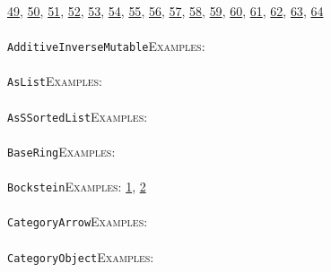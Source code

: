 \documentclass[a4paper,11pt]{report}
\begin{document}
{{\href{../www/SideLinks/About/aboutSpaceGroup.html} {49}{\nobreakspace}, \href{../www/SideLinks/About/aboutFunctorial.html} {50}{\nobreakspace}, \href{../www/SideLinks/About/aboutSuperperfect.html} {51}{\nobreakspace}, \href{../www/SideLinks/About/aboutGouter.html} {52}{\nobreakspace}, \href{../www/SideLinks/About/aboutSurvey.html} {53}{\nobreakspace}, \href{../www/SideLinks/About/aboutGraphsOfGroups.html} {54}{\nobreakspace}, \href{../www/SideLinks/About/aboutTDA.html} {55}{\nobreakspace}, \href{../www/SideLinks/About/aboutIntro.html} {56}{\nobreakspace}, \href{../www/SideLinks/About/aboutKnots.html} {57}{\nobreakspace}, \href{../www/SideLinks/About/aboutTensorSquare.html} {58}{\nobreakspace}, \href{../www/SideLinks/About/aboutKnotsQuandles.html} {59}{\nobreakspace}, \href{../www/SideLinks/About/aboutTopology.html} {60}{\nobreakspace}, \href{../www/SideLinks/About/aboutLieCovers.html} {61}{\nobreakspace}, \href{../www/SideLinks/About/aboutTorAndExt.html} {62}{\nobreakspace}, \href{../www/SideLinks/About/aboutLie.html} {63}{\nobreakspace}, \href{../www/SideLinks/About/aboutTwistedCoefficients.html} {64}{\nobreakspace} \\
 \\
 \texttt{AdditiveInverseMutable}{\nobreakspace}{\nobreakspace}{\nobreakspace}{\nobreakspace}\textsc{Examples:} \\
 \\
 \texttt{AsList}{\nobreakspace}{\nobreakspace}{\nobreakspace}{\nobreakspace}\textsc{Examples:} \\
 \\
 \texttt{AsSSortedList}{\nobreakspace}{\nobreakspace}{\nobreakspace}{\nobreakspace}\textsc{Examples:} \\
 \\
 \texttt{BaseRing}{\nobreakspace}{\nobreakspace}{\nobreakspace}{\nobreakspace}\textsc{Examples:} \\
 \\
 \texttt{Bockstein}{\nobreakspace}{\nobreakspace}{\nobreakspace}{\nobreakspace}\textsc{Examples:} \href{tutorial/chap7.html} {1}{\nobreakspace}, \href{../www/SideLinks/About/aboutModPRings.html} {2}{\nobreakspace} \\
 \\
 \texttt{CategoryArrow}{\nobreakspace}{\nobreakspace}{\nobreakspace}{\nobreakspace}\textsc{Examples:} \\
 \\
 \texttt{CategoryObject}{\nobreakspace}{\nobreakspace}{\nobreakspace}{\nobreakspace}\textsc{Examples:} \\
}}
\end{document}
